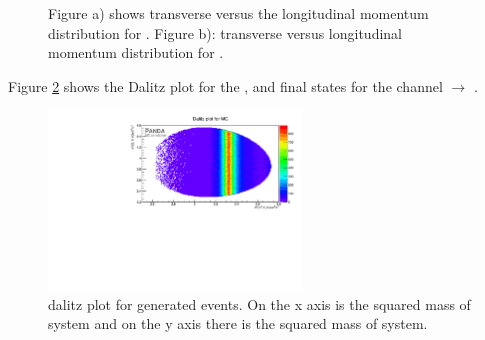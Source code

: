 \begin{figure}
	\caption{\propose Figure a) shows transverse versus the longitudinal momentum distribution for \anticascade. Figure b):
			transverse versus longitudinal momentum distribution for \excitedcascade.}
	\label{fig:MC_xi_pt_vs_pz}
\end{figure}

Figure \ref{fig:eventgeneration_Dalitz} shows the Dalitz plot for the \lam, \kminus and \anticascade final states for 
the channel \pbarpSystem $\rightarrow$ \excitedcascade \anticascade. 

\begin{figure}
	\centering
	\includegraphics[width=0.6\textwidth]{./plots/Dalitzplot_MC.pdf}
	\caption{\propose \anticascade\lam\kminus dalitz plot for generated events. On the x axis is the squared mass of \lam\kminus system and on the y axis there is the squared mass of \anticascade\kminus system.}
	\label{fig:eventgeneration_Dalitz}
\end{figure}

